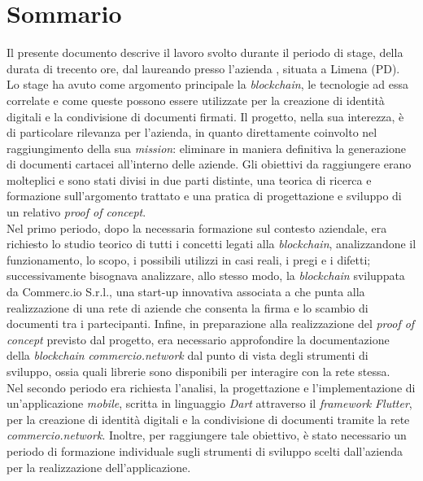 
\cleardoublepage
{}
{}
\begingroup
\let\clearpage\relax
\let\cleardoublepage\relax
\let\cleardoublepage\relax

\chapter*{Sommario}

Il presente documento descrive il lavoro svolto durante il periodo di stage, della durata di trecento ore, dal laureando \myName{} presso l'azienda \myCompany{} \companyTitle{}, situata a Limena (PD).\\
Lo stage ha avuto come argomento principale la \textit{blockchain}, le tecnologie ad essa correlate e come queste possono essere utilizzate per la creazione di identità digitali e la condivisione di documenti firmati. Il progetto, nella sua interezza, è di particolare rilevanza per l'azienda, in quanto direttamente coinvolto nel raggiungimento della sua \textit{mission}: eliminare in maniera definitiva la generazione di documenti cartacei all'interno delle aziende.
Gli obiettivi da raggiungere erano molteplici e sono stati divisi in due parti distinte, una teorica di ricerca e formazione sull'argomento trattato e una pratica di progettazione e sviluppo di un relativo \textit{proof of concept}.\\
Nel primo periodo, dopo la necessaria formazione sul contesto aziendale, era richiesto lo studio teorico di tutti i concetti legati alla \textit{blockchain}, analizzandone il funzionamento, lo scopo, i possibili utilizzi in casi reali, i pregi e i difetti; successivamente bisognava analizzare, allo stesso modo, la \textit{blockchain} sviluppata da Commerc.io S.r.l., una start-up innovativa associata a \myCompany{} \companyTitle{} che punta alla realizzazione di una rete di aziende che consenta la firma e lo scambio di documenti tra i partecipanti. Infine, in preparazione alla realizzazione del \textit{proof of concept} previsto dal progetto, era necessario approfondire la documentazione della \textit{blockchain} \textit{commercio.network} dal punto di vista degli strumenti di sviluppo, ossia quali librerie sono disponibili per interagire con la rete stessa.\\
Nel secondo periodo era richiesta l'analisi, la progettazione e l'implementazione di un'applicazione \textit{mobile}, scritta in linguaggio \textit{Dart} attraverso il \textit{framework} \textit{Flutter}, per la creazione di identità digitali e la condivisione di documenti tramite la rete \textit{commercio.network}. Inoltre, per raggiungere tale obiettivo, è stato necessario un periodo di formazione individuale sugli strumenti di sviluppo scelti dall'azienda per la realizzazione dell'applicazione.

%
%

\endgroup			

\vfill

